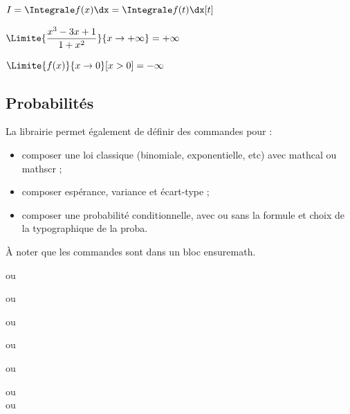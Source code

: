 \begin{PresCodeTexPL}{}
$I = \Integrale f(x) \dx = \Integrale f(t) \dx[t]$
\end{PresCodeTexPL}

\begin{PresCodeTexPL}{}
$\Limite{\dfrac{x^3-3x+1}{1+x^2}}{x \to +\infty} = +\infty$

$\Limite{f(x)}{x \to 0}[x > 0] = -\infty$
\end{PresCodeTexPL}

\subsection{Probabilités}

\begin{tipblock}
La librairie  permet également de définir des commandes pour :

\begin{itemize}
	\item composer une loi classique (binomiale, exponentielle, etc) avec \textsf{mathcal} ou \textsf{mathscr} ;
	\item composer espérance, variance et écart-type ;
	\item {} composer une probabilité conditionnelle, avec ou sans la formule et choix de la typographique de la proba.
\end{itemize}

À noter que les commandes sont dans un bloc \textsf{ensuremath}.
\end{tipblock}

\begin{PresCodeTexPL}{}

 ou 

 ou 

 ou 

 ou 

 ou 
\end{PresCodeTexPL}

\begin{PresCodeTexPL}{}
{} ou  \\
 ou  \\
\end{PresCodeTexPL}

